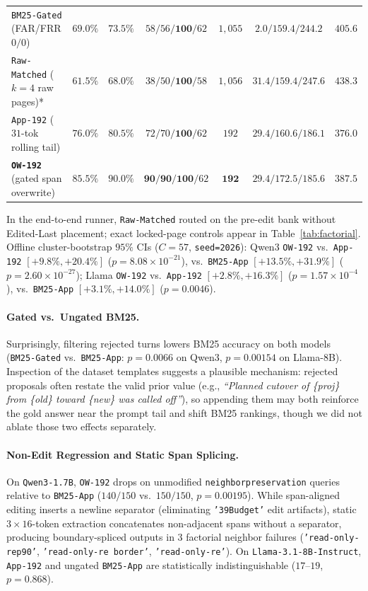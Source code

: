 \documentclass[11pt]{article}
\renewcommand{\_}{\origunderscore\allowbreak}
\begin{document}
\begin{table}[t]
{\begin{tabular}{@{}lcccccc@{}}
\texttt{BM25-Gated} (FAR/FRR $0/0$) & $69.0\%$ & $73.5\%$ & $58 / 56 / \mathbf{100} / 62$ & $1{,}055$ & $2.0 / 159.4 / 244.2$ & $405.6$ \\
\texttt{Raw-Matched} ($k=4$ raw pages)* & $61.5\%$ & $68.0\%$ & $38 / 50 / \mathbf{100} / 58$ & $1{,}056$ & $31.4 / 159.4 / 247.6$ & $438.3$ \\
\texttt{App-192} ($31$-tok rolling tail) & $76.0\%$ & $80.5\%$ & $72 / 70 / \mathbf{100} / 62$ & $192$ & $29.4 / 160.6 / 186.1$ & $376.0$ \\
\textbf{\texttt{OW-192}} (gated span overwrite) & $\mathbf{85.5\%}$ & $\mathbf{90.0\%}$ & $\mathbf{90} / \mathbf{90} / \mathbf{100} / 62$ & $\mathbf{192}$ & $29.4 / 172.5 / \mathbf{185.6}$ & $387.5$ \\
\bottomrule
\end{tabular}%
}
\vspace{2pt}
\parbox{\textwidth}{\footnotesize *In the end-to-end runner, \texttt{Raw-Matched} routed on the pre-edit bank without Edited-Last placement; exact locked-page controls appear in Table~\ref{tab:factorial}. Offline cluster-bootstrap $95\%$ CIs ($C=57$, \texttt{seed=2026}): Qwen3 \texttt{OW-192} vs.\ \texttt{App-192} $[+9.8\%, +20.4\%]$ ($p=8.08\times 10^{-21}$), vs.\ \texttt{BM25-App} $[+13.5\%, +31.9\%]$ ($p=2.60\times 10^{-27}$); Llama \texttt{OW-192} vs.\ \texttt{App-192} $[+2.8\%, +16.3\%]$ ($p=1.57\times 10^{-4}$), vs.\ \texttt{BM25-App} $[+3.1\%, +14.0\%]$ ($p=0.0046$).}
\end{table}

\paragraph{Gated vs.\ Ungated BM25.}
Surprisingly, filtering rejected turns lowers BM25 accuracy on both models (\texttt{BM25-Gated} vs.\ \texttt{BM25-App}: $p=0.0066$ on Qwen3, $p=0.00154$ on Llama-8B). Inspection of the dataset templates suggests a plausible mechanism: rejected proposals often restate the valid prior value (e.g., \emph{``Planned cutover of \{proj\} from \{old\} toward \{new\} was called off''}), so appending them may both reinforce the gold answer near the prompt tail and shift BM25 rankings, though we did not ablate those two effects separately.

\paragraph{Non-Edit Regression and Static Span Splicing.}
On \texttt{Qwen3-1.7B}, \texttt{OW-192} drops on unmodified \texttt{neighbor\_preservation} queries relative to \texttt{BM25-App} ($140/150$ vs.\ $150/150$, $p=0.00195$). While span-aligned editing inserts a newline separator (eliminating \texttt{'39Budget'} edit artifacts), static $3\times 16$-token extraction concatenates non-adjacent spans without a separator, producing boundary-spliced outputs in $3$ factorial neighbor failures (\texttt{'read-only-rep90'}, \texttt{'read-only-re border'}, \texttt{'read-only-re'}). On \texttt{Llama-3.1-8B-Instruct}, \texttt{App-192} and ungated \texttt{BM25-App} are statistically indistinguishable ($17$--$19$, $p=0.868$).
\end{document}
